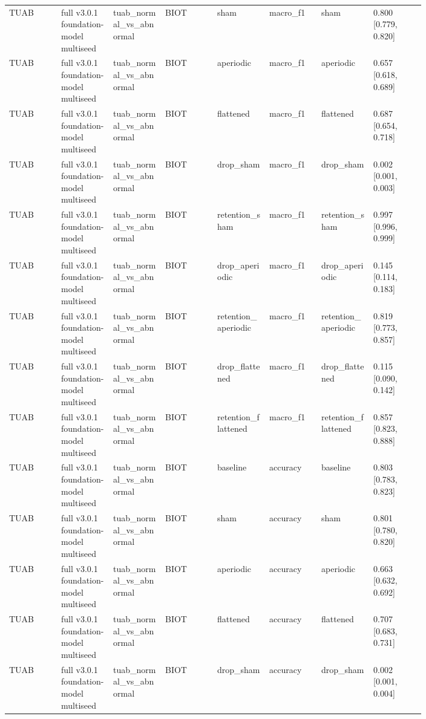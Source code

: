 \begin{longtable}{p{0.10\linewidth}p{0.10\linewidth}p{0.10\linewidth}p{0.10\linewidth}p{0.10\linewidth}p{0.10\linewidth}p{0.10\linewidth}p{0.10\linewidth}}
TUAB & full v3.0.1 foundation-model multiseed & tuab\_normal\_vs\_abnormal & BIOT & sham & macro\_f1 & sham & 0.800 [0.779, 0.820]\\
TUAB & full v3.0.1 foundation-model multiseed & tuab\_normal\_vs\_abnormal & BIOT & aperiodic & macro\_f1 & aperiodic & 0.657 [0.618, 0.689]\\
TUAB & full v3.0.1 foundation-model multiseed & tuab\_normal\_vs\_abnormal & BIOT & flattened & macro\_f1 & flattened & 0.687 [0.654, 0.718]\\
TUAB & full v3.0.1 foundation-model multiseed & tuab\_normal\_vs\_abnormal & BIOT & drop\_sham & macro\_f1 & drop\_sham & 0.002 [0.001, 0.003]\\
TUAB & full v3.0.1 foundation-model multiseed & tuab\_normal\_vs\_abnormal & BIOT & retention\_sham & macro\_f1 & retention\_sham & 0.997 [0.996, 0.999]\\
TUAB & full v3.0.1 foundation-model multiseed & tuab\_normal\_vs\_abnormal & BIOT & drop\_aperiodic & macro\_f1 & drop\_aperiodic & 0.145 [0.114, 0.183]\\
TUAB & full v3.0.1 foundation-model multiseed & tuab\_normal\_vs\_abnormal & BIOT & retention\_aperiodic & macro\_f1 & retention\_aperiodic & 0.819 [0.773, 0.857]\\
TUAB & full v3.0.1 foundation-model multiseed & tuab\_normal\_vs\_abnormal & BIOT & drop\_flattened & macro\_f1 & drop\_flattened & 0.115 [0.090, 0.142]\\
TUAB & full v3.0.1 foundation-model multiseed & tuab\_normal\_vs\_abnormal & BIOT & retention\_flattened & macro\_f1 & retention\_flattened & 0.857 [0.823, 0.888]\\
TUAB & full v3.0.1 foundation-model multiseed & tuab\_normal\_vs\_abnormal & BIOT & baseline & accuracy & baseline & 0.803 [0.783, 0.823]\\
TUAB & full v3.0.1 foundation-model multiseed & tuab\_normal\_vs\_abnormal & BIOT & sham & accuracy & sham & 0.801 [0.780, 0.820]\\
TUAB & full v3.0.1 foundation-model multiseed & tuab\_normal\_vs\_abnormal & BIOT & aperiodic & accuracy & aperiodic & 0.663 [0.632, 0.692]\\
TUAB & full v3.0.1 foundation-model multiseed & tuab\_normal\_vs\_abnormal & BIOT & flattened & accuracy & flattened & 0.707 [0.683, 0.731]\\
TUAB & full v3.0.1 foundation-model multiseed & tuab\_normal\_vs\_abnormal & BIOT & drop\_sham & accuracy & drop\_sham & 0.002 [0.001, 0.004]\\

\end{longtable}
